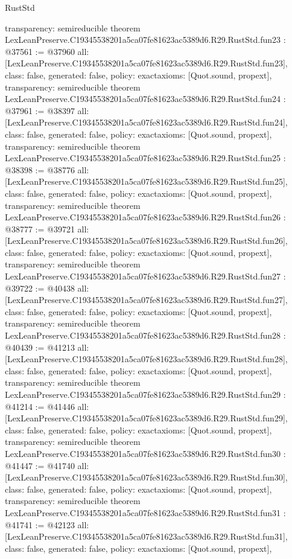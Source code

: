 \begin{lexlean}{RustStd}
\begin{coremodule}
{  transparency: semireducible
}
theorem LexLeanPreserve.C19345538201a5ca07fe81623ac5389d6.R29.RustStd.fun23 : @37561 := @37960 {
  all: [LexLeanPreserve.C19345538201a5ca07fe81623ac5389d6.R29.RustStd.fun23],
  class: false,
  generated: false,
  policy: exact{axioms: [Quot.sound, propext]},
  transparency: semireducible
}
theorem LexLeanPreserve.C19345538201a5ca07fe81623ac5389d6.R29.RustStd.fun24 : @37961 := @38397 {
  all: [LexLeanPreserve.C19345538201a5ca07fe81623ac5389d6.R29.RustStd.fun24],
  class: false,
  generated: false,
  policy: exact{axioms: [Quot.sound, propext]},
  transparency: semireducible
}
theorem LexLeanPreserve.C19345538201a5ca07fe81623ac5389d6.R29.RustStd.fun25 : @38398 := @38776 {
  all: [LexLeanPreserve.C19345538201a5ca07fe81623ac5389d6.R29.RustStd.fun25],
  class: false,
  generated: false,
  policy: exact{axioms: [Quot.sound, propext]},
  transparency: semireducible
}
theorem LexLeanPreserve.C19345538201a5ca07fe81623ac5389d6.R29.RustStd.fun26 : @38777 := @39721 {
  all: [LexLeanPreserve.C19345538201a5ca07fe81623ac5389d6.R29.RustStd.fun26],
  class: false,
  generated: false,
  policy: exact{axioms: [Quot.sound, propext]},
  transparency: semireducible
}
theorem LexLeanPreserve.C19345538201a5ca07fe81623ac5389d6.R29.RustStd.fun27 : @39722 := @40438 {
  all: [LexLeanPreserve.C19345538201a5ca07fe81623ac5389d6.R29.RustStd.fun27],
  class: false,
  generated: false,
  policy: exact{axioms: [Quot.sound, propext]},
  transparency: semireducible
}
theorem LexLeanPreserve.C19345538201a5ca07fe81623ac5389d6.R29.RustStd.fun28 : @40439 := @41213 {
  all: [LexLeanPreserve.C19345538201a5ca07fe81623ac5389d6.R29.RustStd.fun28],
  class: false,
  generated: false,
  policy: exact{axioms: [Quot.sound, propext]},
  transparency: semireducible
}
theorem LexLeanPreserve.C19345538201a5ca07fe81623ac5389d6.R29.RustStd.fun29 : @41214 := @41446 {
  all: [LexLeanPreserve.C19345538201a5ca07fe81623ac5389d6.R29.RustStd.fun29],
  class: false,
  generated: false,
  policy: exact{axioms: [Quot.sound, propext]},
  transparency: semireducible
}
theorem LexLeanPreserve.C19345538201a5ca07fe81623ac5389d6.R29.RustStd.fun30 : @41447 := @41740 {
  all: [LexLeanPreserve.C19345538201a5ca07fe81623ac5389d6.R29.RustStd.fun30],
  class: false,
  generated: false,
  policy: exact{axioms: [Quot.sound, propext]},
  transparency: semireducible
}
theorem LexLeanPreserve.C19345538201a5ca07fe81623ac5389d6.R29.RustStd.fun31 : @41741 := @42123 {
  all: [LexLeanPreserve.C19345538201a5ca07fe81623ac5389d6.R29.RustStd.fun31],
  class: false,
  generated: false,
  policy: exact{axioms: [Quot.sound, propext]},
}
\end{coremodule}
\end{lexlean}
